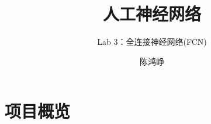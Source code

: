 \documentclass[logo,reportComp]{thesis}
\title{人工神经网络}
\subtitle{Lab 3：全连接神经网络(FCN)}
\author{陈鸿峥}
\begin{document}
\maketitle
\tableofcontents

\newpage

\section{项目概览}
\end{document}
